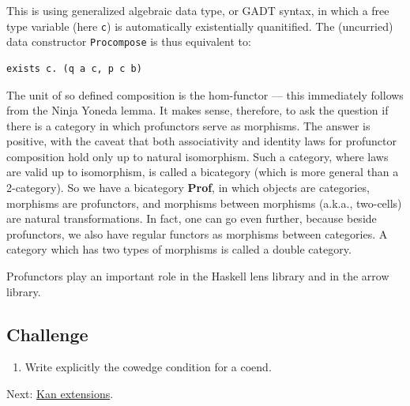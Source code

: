This is using generalized algebraic data type, or GADT syntax, in which
a free type variable (here \texttt{c}) is automatically existentially
quanitified. The (uncurried) data constructor \texttt{Procompose} is
thus equivalent to:

\begin{verbatim}
exists c. (q a c, p c b)
\end{verbatim}

The unit of so defined composition is the hom-functor --- this
immediately follows from the Ninja Yoneda lemma. It makes sense,
therefore, to ask the question if there is a category in which
profunctors serve as morphisms. The answer is positive, with the caveat
that both associativity and identity laws for profunctor composition
hold only up to natural isomorphism. Such a category, where laws are
valid up to isomorphism, is called a bicategory (which is more general
than a 2-category). So we have a bicategory \textbf{Prof}, in which
objects are categories, morphisms are profunctors, and morphisms between
morphisms (a.k.a., two-cells) are natural transformations. In fact, one
can go even further, because beside profunctors, we also have regular
functors as morphisms between categories. A category which has two types
of morphisms is called a double category.

Profunctors play an important role in the Haskell lens library and in
the arrow library.

\subsection{Challenge}\label{challenge}

\begin{enumerate}
\tightlist
\item
  Write explicitly the cowedge condition for a coend.
\end{enumerate}

Next: \href{https://bartoszmilewski.com/2017/04/17/kan-extensions/}{Kan
extensions}.
